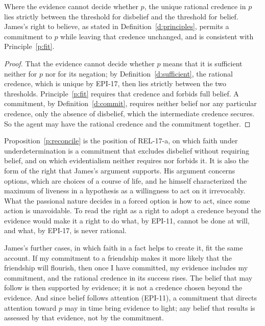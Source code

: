 \documentclass{situationist-preprint}
\begin{document}
\begin{proposition}[Reconciliation]\label{p:reconcile}
Where the evidence cannot decide whether $p$, the unique rational credence in $p$ lies strictly between the threshold for disbelief and the threshold for belief. James's right to believe, as stated in Definition~\ref{d:principles}, permits a commitment to $p$ while leaving that credence unchanged, and is consistent with Principle~\ref{p:fit}.
\end{proposition}

\begin{proof}
That the evidence cannot decide whether $p$ means that it is sufficient neither for $p$ nor for its negation; by Definition~\ref{d:sufficient}, the rational credence, which is unique by EPI-17, then lies strictly between the two thresholds. Principle~\ref{p:fit} requires that credence and forbids full belief. A commitment, by Definition~\ref{d:commit}, requires neither belief nor any particular credence, only the absence of disbelief, which the intermediate credence secures. So the agent may have the rational credence and the commitment together.
\end{proof}

Proposition~\ref{p:reconcile} is the position of REL-17-a, on which faith under underdetermination is a commitment that excludes disbelief without requiring belief, and on which evidentialism neither requires nor forbids it. It is also the form of the right that James's argument supports. His argument concerns options, which are choices of a course of life, and he himself characterized the maximum of liveness in a hypothesis as a willingness to act on it irrevocably. What the passional nature decides in a forced option is how to act, since some action is unavoidable. To read the right as a right to adopt a credence beyond the evidence would make it a right to do what, by EPI-11, cannot be done at will, and what, by EPI-17, is never rational.

James's further cases, in which faith in a fact helps to create it, fit the same account. If my commitment to a friendship makes it more likely that the friendship will flourish, then once I have committed, my evidence includes my commitment, and the rational credence in its success rises. The belief that may follow is then supported by evidence; it is not a credence chosen beyond the evidence. And since belief follows attention (EPI-11), a commitment that directs attention toward $p$ may in time bring evidence to light; any belief that results is assessed by that evidence, not by the commitment.
\end{document}
